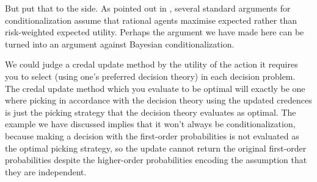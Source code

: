\documentclass[a4paper]{article}
\newenvironment{CCM rewritten}
{\begingroup\color{blue}} %
{\endgroup}              %
\begin{document}



{ But put that to the side. As pointed out in \citet[sec7]{campbellmoore2020arae}, several standard arguments for conditionalization assume that rational agents maximise expected rather than risk-weighted expected utility. Perhaps the argument we have made here can be turned into an argument against Bayesian conditionalization.}



We could judge a credal update method by the utility of the action it requires you to select (using one's preferred decision theory) in each decision problem. The credal update method which you evaluate to be optimal will exactly be one where picking in accordance with the decision theory using the updated credences is just the picking strategy that the decision theory evaluates as optimal. The example we have discussed implies that it won't always be conditionalization, because making a decision with the first-order probabilities is not evaluated as the optimal picking strategy, so the update cannot return the original first-order probabilities despite the higher-order probabilities encoding the assumption that they are independent. 
\end{document}
